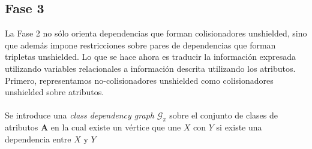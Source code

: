 \documentclass[11pt]{article}
\theoremstyle{plain}
\begin{document}
\subsection{Fase 3}
La Fase 2 no sólo orienta dependencias que forman colisionadores unshielded, sino que además impone restricciones sobre pares de dependencias que forman tripletas unshielded. Lo que se hace ahora es traducir la información expresada utilizando variables relacionales a información descrita utilizando los atributos. Primero, representamos no-colisionadores unshielded como colisionadores unshielded sobre atributos.\\
\\
Se introduce una \textit{class dependency graph} $\mathcal{G}_{\pi}$ sobre el conjunto de clases de atributos $\mathbf{A}$ en la cual existe un vértice que une $X$ con $Y$ si existe una dependencia entre $X$ y $Y$
\end{document}
